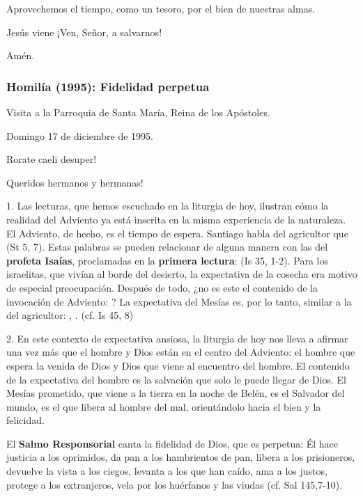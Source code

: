 \begin{body}
\begin{body}
Aprovechemos el tiempo, como un tesoro, por el bien de nuestras almas.

Jesús viene ¡Ven, Señor, a salvarnos!

Amén.

\subsubsection{Homilía (1995): Fidelidad perpetua}

Visita a la Parroquia de Santa María, Reina de los Apóstoles.

Domingo 17 de diciembre de 1995.

Rorate caeli desuper!

Queridos hermanos y hermanas!

1. Las lecturas, que hemos escuchado en la liturgia de hoy, ilustran cómo la realidad del Adviento ya está inscrita en la misma experiencia de la naturaleza. El Adviento, de hecho, es el tiempo de espera. Santiago habla del agricultor que  (St 5, 7). Estas palabras se pueden relacionar de alguna manera con las del \textbf{profeta Isaías}, proclamadas en la \textbf{primera lectura}:  (Is 35, 1-2). Para los israelitas, que vivían al borde del desierto, la expectativa de la cosecha era motivo de especial preocupación. Después de todo, ¿no es este el contenido de la invocación de Adviento: ? La expectativa del Mesías es, por lo tanto, similar a la del agricultor: , . (cf. Is 45, 8)

2. En este contexto de expectativa ansiosa, la liturgia de hoy nos lleva a afirmar una vez más que el hombre y Dios están en el centro del Adviento: el hombre que espera la venida de Dios y Dios que viene al encuentro del hombre. El contenido de la expectativa del hombre es la salvación que solo le puede llegar de Dios. El Mesías prometido, que viene a la tierra en la noche de Belén, es el Salvador del mundo, es el que libera al hombre del mal, orientándolo hacia el bien y la felicidad.

El \textbf{Salmo Responsorial} canta la fidelidad de Dios, que es perpetua: Él hace justicia a los oprimidos, da pan a los hambrientos de pan, libera a los prisioneros, devuelve la vista a los ciegos, levanta a los que han caído, ama a los justos, protege a los extranjeros, vela por los huérfanos y las viudas (cf. Sal 145,7-10).


\end{body}
\end{body}
